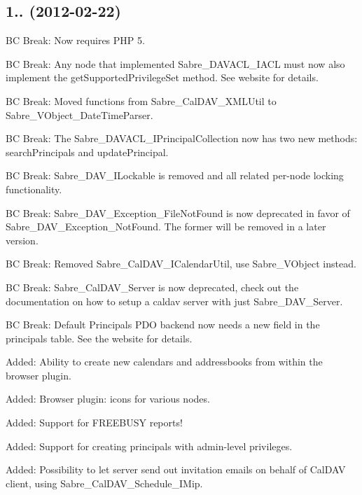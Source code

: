 \subsection*{1.. (2012-\/02-\/22) }


\begin{DoxyItemize}
\item BC Break\+: Now requires P\+HP 5.
\item BC Break\+: Any node that implemented Sabre\+\_\+\+D\+A\+V\+A\+C\+L\+\_\+\+I\+A\+CL must now also implement the get\+Supported\+Privilege\+Set method. See website for details.
\item BC Break\+: Moved functions from Sabre\+\_\+\+Cal\+D\+A\+V\+\_\+\+X\+M\+L\+Util to Sabre\+\_\+\+V\+Object\+\_\+\+Date\+Time\+Parser.
\item BC Break\+: The Sabre\+\_\+\+D\+A\+V\+A\+C\+L\+\_\+\+I\+Principal\+Collection now has two new methods\+: \textquotesingle{}search\+Principals\textquotesingle{} and \textquotesingle{}update\+Principal\textquotesingle{}.
\item BC Break\+: Sabre\+\_\+\+D\+A\+V\+\_\+\+I\+Lockable is removed and all related per-\/node locking functionality.
\item BC Break\+: Sabre\+\_\+\+D\+A\+V\+\_\+\+Exception\+\_\+\+File\+Not\+Found is now deprecated in favor of Sabre\+\_\+\+D\+A\+V\+\_\+\+Exception\+\_\+\+Not\+Found. The former will be removed in a later version.
\item BC Break\+: Removed Sabre\+\_\+\+Cal\+D\+A\+V\+\_\+\+I\+Calendar\+Util, use Sabre\+\_\+\+V\+Object instead.
\item BC Break\+: Sabre\+\_\+\+Cal\+D\+A\+V\+\_\+\+Server is now deprecated, check out the documentation on how to setup a caldav server with just Sabre\+\_\+\+D\+A\+V\+\_\+\+Server.
\item BC Break\+: Default Principals P\+DO backend now needs a new field in the \textquotesingle{}principals\textquotesingle{} table. See the website for details.
\item Added\+: Ability to create new calendars and addressbooks from within the browser plugin.
\item Added\+: Browser plugin\+: icons for various nodes.
\item Added\+: Support for F\+R\+E\+E\+B\+U\+SY reports!
\item Added\+: Support for creating principals with admin-\/level privileges.
\item Added\+: Possibility to let server send out invitation emails on behalf of Cal\+D\+AV client, using Sabre\+\_\+\+Cal\+D\+A\+V\+\_\+\+Schedule\+\_\+\+I\+Mip.

\end{DoxyItemize}
